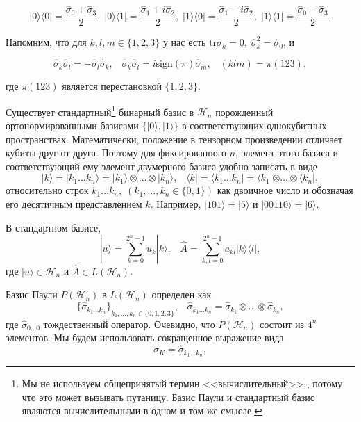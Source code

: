 \documentclass[a4paper]{report}
\begin{document}
$${
            |0\rangle\langle0| = \frac{\hat{\sigma}_0 + \hat{\sigma}_3}{2},\;
            |0\rangle\langle1| = \frac{\hat{\sigma}_1 + i\hat{\sigma}_2}{2},\;
            |1\rangle\langle0| = \frac{\hat{\sigma}_1 - i\hat{\sigma}_2}{2},\;
            |1\rangle\langle1| = \frac{\hat{\sigma}_0 - \hat{\sigma}_3}{2}.
        }$$

Напомним, что для ${k, l, m \in \{1,2,3\} }$ у нас есть ${\mathrm{tr}\hat{\sigma}_k = 0,\; \hat{\sigma}^2_k} = \hat{\sigma}_0$, и

\begin{equation}\tag{2}\label{eq2}
    \hat{\sigma}_k\hat{\sigma}_l = -\hat{\sigma}_l\hat{\sigma}_k, \;\;\; \hat{\sigma}_k\hat{\sigma}_l = i\mathrm{sign}(\pi)\hat{\sigma}_m, \;\;\; (klm) = \pi(123),
\end{equation}

\noindent где ${\pi(123)}$ является перестановкой ${\{1,2,3\}}$.

Существует стандартный\footnote[1]{Мы не используем общепринятый термин <<вычислительный>> , потому что это может вызывать путаницу. Базис Паули и стандартный базис являются вычислительными в одном и том же смысле.} бинарный базис в ${\mathcal{H}_n}$ порожденный ортонормированными базисами ${\{|0\rangle,|1\rangle\}}$ в соответствующих однокубитных пространствах. Математически, положение в тензорном произведении отличает кубиты друг от друга. Поэтому для фиксированного ${n}$, элемент этого базиса и соответствующий ему элемент  двумерного базиса удобно записать в виде
$${
            |k\rangle = |k_1\ldots k_n\rangle = |k_1\rangle \otimes \ldots \otimes |k_n\rangle,\;\;\; \langle k| = \langle k_1\ldots k_n| = \langle k_1|\otimes\ldots\otimes\langle k_n|,
        }$$
\noindent относительно строк ${k_1\ldots k_n,\; (k_1,\ldots,k_n\in\{0, 1\})}$ как двоичное число и обозначая его десятичным представлением ${k}$. Например, ${|101\rangle = |5\rangle}$ и ${|00110\rangle = |6\rangle}$.

В стандартном базисе,
$${
            |u\rangle = \sum_{k=0}^{2^n - 1} u_k |k\rangle, \;\;\; \hat{A} = \sum_{k,l=0}^{2^n - 1} a_{kl} |k\rangle\langle l|,
        }$$
\noindent где ${|u\rangle \in \mathcal{H}_n}$ и ${\hat{A} \in L(\mathcal{H}_n)}$.

Базис Паули ${P(\mathcal{H}_n)}$ в ${L(\mathcal{H}_n)}$ определен как
\begin{equation}\tag{3}\label{eq3}
    {\{\hat{\sigma}_{k_1\ldots k_n}\}}_{k_1,\ldots,k_n\in\{0,1,2,3\}},\;\;\;\hat{\sigma}_{k_1\ldots k_n} = \hat{\sigma}_{k_1}\otimes\ldots\otimes\hat{\sigma}_{k_n},
\end{equation}
\noindent где ${\hat{\sigma}_{0\ldots 0}}$ тождественный оператор. Очевидно, что  ${P(\mathcal{H}_n)}$ состоит из ${4^n}$ элементов. Мы будем использовать сокращенное выражение вида
$${
            \hat{\sigma}_K = \hat{\sigma}_{k_1\ldots k_n},
        }$$
\end{document}
